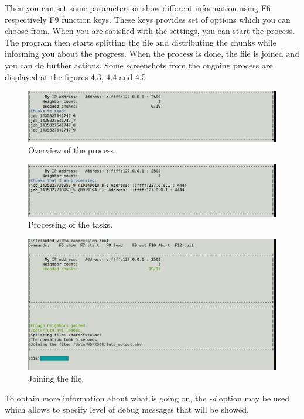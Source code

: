 Then you can set some parameters or show different information using F6 respectively F9 function keys. These keys provides set of options which you can choose from. When you are satisfied with the settings, you can start the process.
The program then starts splitting the file and distributing the chunks while informing you about the progress. When the process is done, the file is joined and you can do further actions. Some screenshots from the ongoing process are displayed at the figures 4.3, 4.4 and 4.5
\begin{figure}[h]
\begin{center}
\includegraphics[scale=0.35]{./img/process-initiator.pdf}
\caption{Overview of the process.}
\end{center}
\end{figure}
\begin{figure}[h]
\begin{center}
\includegraphics[scale=0.35]{./img/processing.pdf}
\caption{Processing of the tasks.}
\end{center}
\end{figure}
\begin{figure}[h]
\begin{center}
\includegraphics[scale=0.35]{./img/joining.pdf}
\caption{Joining the file.}
\end{center}
\end{figure}

To obtain more information about what is going on, the \textit{-d} option may be used which allows to specify level of debug messages that will be showed.